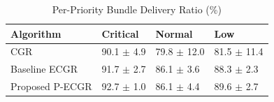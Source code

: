 \begin{table}[t]
\centering
\caption{Per-Priority Bundle Delivery Ratio (\%)}
\label{tab:priority}
\begin{tabular*}{\textwidth}{@{\extracolsep{\fill}}llll}
\hline
\textbf{Algorithm} & \textbf{Critical} & \textbf{Normal} & \textbf{Low} \\
\hline
CGR & 90.1 $\pm$ 4.9 & 79.8 $\pm$ 12.0 & 81.5 $\pm$ 11.4 \\
Baseline ECGR & 91.7 $\pm$ 2.7 & 86.1 $\pm$ 3.6 & 88.3 $\pm$ 2.3 \\
Proposed P-ECGR & 92.7 $\pm$ 1.0 & 86.1 $\pm$ 4.4 & 89.6 $\pm$ 2.7 \\
\hline
\end{tabular*}
\end{table}
